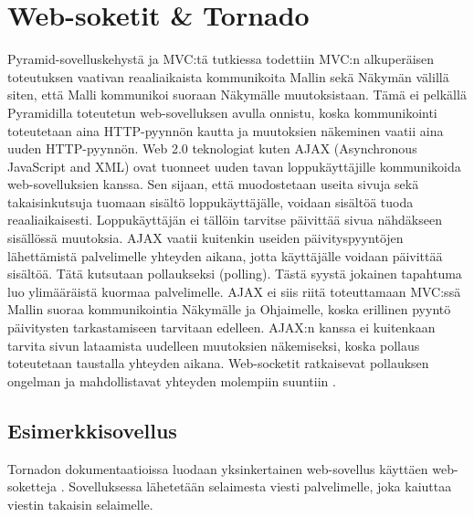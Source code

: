 \documentclass[utf8]{gradu3}
\begin{document}
\chapter{Web-soketit \& Tornado}
Pyramid-sovelluskehystä ja MVC:tä tutkiessa todettiin MVC:n alkuperäisen toteutuksen vaativan reaaliaikaista kommunikoita Mallin sekä Näkymän välillä siten, että Malli kommunikoi suoraan Näkymälle muutoksistaan. Tämä ei pelkällä Pyramidilla toteutetun web-sovelluksen avulla onnistu, koska kommunikointi toteutetaan aina HTTP-pyynnön kautta ja muutoksien näkeminen vaatii aina uuden HTTP-pyynnön. Web 2.0 teknologiat kuten AJAX (Asynchronous JavaScript and XML) ovat tuonneet uuden tavan loppukäyttäjille kommunikoida web-sovelluksien kanssa. Sen sijaan, että muodostetaan useita sivuja sekä takaisinkutsuja tuomaan sisältö loppukäyttäjälle, voidaan sisältöä tuoda reaaliaikaisesti. Loppukäyttäjän ei tällöin tarvitse päivittää sivua nähdäkseen sisällössä muutoksia. AJAX vaatii kuitenkin useiden päivityspyyntöjen lähettämistä palvelimelle yhteyden aikana, jotta käyttäjälle voidaan päivittää sisältöä. Tätä kutsutaan pollaukseksi (polling). Tästä syystä jokainen tapahtuma luo ylimääräistä kuormaa palvelimelle\parencite{websocket_ajax}. AJAX ei siis riitä toteuttamaan MVC:ssä Mallin suoraa kommunikointia Näkymälle ja Ohjaimelle, koska erillinen pyyntö päivitysten tarkastamiseen tarvitaan edelleen. AJAX:n kanssa ei kuitenkaan tarvita sivun lataamista uudelleen muutoksien näkemiseksi, koska pollaus toteutetaan taustalla yhteyden aikana.  Web-socketit ratkaisevat pollauksen ongelman ja mahdollistavat yhteyden molempiin suuntiin \parencite[s. 1.1]{websocket}.

\section{Esimerkkisovellus}

Tornadon dokumentaatioissa luodaan yksinkertainen web-sovellus käyttäen web-soketteja \parencite{tornado_socket}. Sovelluksessa lähetetään selaimesta viesti palvelimelle, joka kaiuttaa viestin takaisin selaimelle. 
\end{document}
